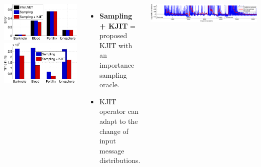 \documentclass[25pt, a0paper, portrait, margin=0mm, innermargin=10mm,
     blockverticalspace=7mm, colspace=7mm, subcolspace=8mm]{tikzposter} %
\begin{document}
\begin{columns}
{\vspace{-5mm}
\begin{tikzfigure}
  \hspace{-10cm}
  \includegraphics[width=13cm]{online/uci_classification-crop}
  \hspace{1cm}
  \includegraphics[width=13cm]{online/uci_infer_time-crop}
\end{tikzfigure}

\begin{itemize}
 \item \textbf{Sampling + KJIT} = proposed KJIT with an importance sampling oracle.
    \item KJIT operator can adapt to the change of input message distributions.
\end{itemize}

\vspace{-5mm}
\begin{tikzfigure}
\centering
\includegraphics[width=38cm]{online/uci_temporal_uncertainty-crop}
\end{tikzfigure}

}
\end{columns}
\end{document}
